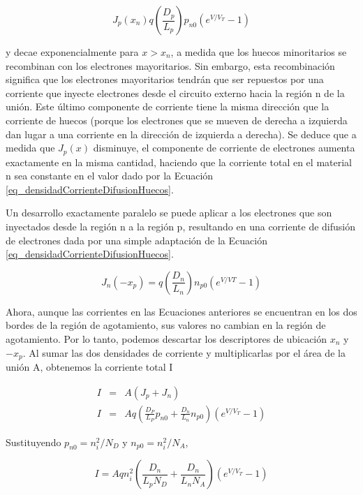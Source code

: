\begin{equation}
J_p (x_n) q \left( \frac{D_p}{L_p} \right) p_{n0} \left( e^{V/V_T} - 1 \right) 
\label{eq_densidadCorrienteDifusionHuecos}
\end{equation}

y decae exponencialmente para \(x > x_n\), a medida que los huecos minoritarios se recombinan con los electrones mayoritarios. Sin embargo, esta recombinación significa que los electrones mayoritarios tendrán que ser repuestos por una corriente que inyecte electrones desde el circuito externo hacia la región n de la unión. Este último componente de corriente tiene la misma dirección que la corriente de huecos (porque los electrones que se mueven de derecha a izquierda dan lugar a una corriente en la dirección de izquierda a derecha). Se deduce que a medida que \(J_p(x)\) disminuye, el componente de corriente de electrones aumenta exactamente en la misma cantidad, haciendo que la corriente total en el material n sea constante en el valor dado por la Ecuación \ref{eq_densidadCorrienteDifusionHuecos}.

Un desarrollo exactamente paralelo se puede aplicar a los electrones que son inyectados desde la región n a la región p, resultando en una corriente de difusión de electrones dada por una simple adaptación de la Ecuación \ref{eq_densidadCorrienteDifusionHuecos}.

\begin{equation*}
J_n(-x_p) = q \left( \frac{D_n}{L_n} \right) n_{p0} \left( e^{V/VT} - 1 \right)
\end{equation*}

Ahora, aunque las corrientes en las Ecuaciones anteriores se encuentran en los dos bordes de la región de agotamiento, sus valores no cambian en la región de agotamiento. Por lo tanto, podemos descartar los descriptores de ubicación \(x_n\) y \(-x_p\). Al sumar las dos densidades de corriente y multiplicarlas por el área de la unión A, obtenemos la corriente total I

\begin{eqnarray*}
I &=& A (J_p + J_n) \\
I &=& A q \left( \frac{D_P}{L_P} p_{n0} + \frac{D_n}{L_n} n_{p0} \right) \left( e^{V/V_T} - 1\right)
\end{eqnarray*}

Sustituyendo $p_{n0}=n_i^2/N_D$ y  $n_{p0}=n_i^2/N_A$,

\begin{equation*}
I = A q n_i^2 \left( \frac{D_n}{L_p N_D} + \frac{D_n}{L_n N_A} \right) \left( e^{V/V_T} - 1\right)
\end{equation*}

